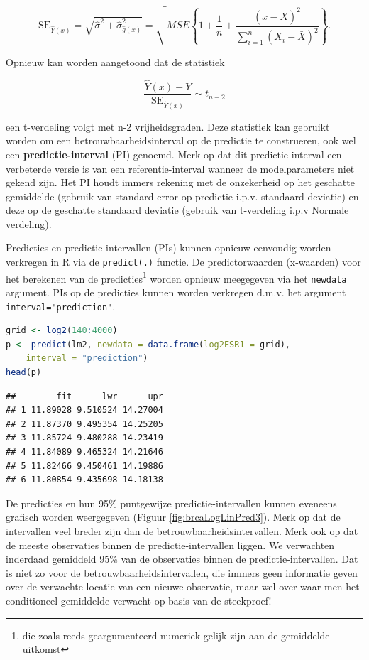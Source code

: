 \documentclass[
  12pt,dutch,coursenotes]{book}
\newcommand{\passthrough}[1]{#1}
\theoremstyle{definition}
\theoremstyle{definition}
\theoremstyle{definition}
\theoremstyle{definition}
\theoremstyle{remark}
\begin{document}
\[\text{SE}_{\hat{Y}(x)}=\sqrt{\hat\sigma^2+\hat\sigma^2_{\hat{g}(x)}}=\sqrt{MSE\left\{1+\frac{1}{n}+\frac{(x-\bar X)^2}{\sum\limits_{i=1}^n (X_i-\bar X)^2}\right\}}.\]

Opnieuw kan worden aangetoond dat de statistiek

\[\frac{\hat{Y}(x)-Y}{\text{SE}_{\hat{Y}(x)}}\sim t_{n-2}\]

een t-verdeling volgt met n-2 vrijheidsgraden.
Deze statistiek kan gebruikt worden om een betrouwbaarheidsinterval op de predictie te construeren, ook wel een \textbf{predictie-interval} (PI) genoemd.
Merk op dat dit predictie-interval een verbeterde versie is van een referentie-interval wanneer de modelparameters niet gekend zijn. Het PI houdt immers rekening met de onzekerheid op het geschatte gemiddelde (gebruik van standard error op predictie i.p.v. standaard deviatie) en deze op de geschatte standaard deviatie (gebruik van t-verdeling i.p.v Normale verdeling).

Predicties en predictie-intervallen (PIs) kunnen opnieuw eenvoudig worden verkregen in R via de \passthrough{\lstinline!predict(.)!} functie.
De predictorwaarden (x-waarden) voor het berekenen van de predicties\footnote{die zoals reeds geargumenteerd numeriek gelijk zijn aan de gemiddelde uitkomst} worden opnieuw meegegeven via het \passthrough{\lstinline!newdata!} argument.
PIs op de predicties kunnen worden verkregen d.m.v. het argument \passthrough{\lstinline!interval="prediction"!}.

\begin{lstlisting}[language=R]
grid <- log2(140:4000)
p <- predict(lm2, newdata = data.frame(log2ESR1 = grid),
    interval = "prediction")
head(p)
\end{lstlisting}

\begin{lstlisting}
##        fit      lwr      upr
## 1 11.89028 9.510524 14.27004
## 2 11.87370 9.495354 14.25205
## 3 11.85724 9.480288 14.23419
## 4 11.84089 9.465324 14.21646
## 5 11.82466 9.450461 14.19886
## 6 11.80854 9.435698 14.18138
\end{lstlisting}

De predicties en hun 95\% puntgewijze predictie-intervallen kunnen eveneens grafisch worden weergegeven (Figuur \ref{fig:brcaLogLinPred3}).
Merk op dat de intervallen veel breder zijn dan de betrouwbaarheidsintervallen.
Merk ook op dat de meeste observaties binnen de predictie-intervallen liggen.
We verwachten inderdaad gemiddeld 95\% van de observaties binnen de predictie-intervallen.
Dat is niet zo voor de betrouwbaarheidsintervallen, die immers geen informatie geven over de verwachte locatie van een nieuwe observatie, maar wel over waar men het conditioneel gemiddelde verwacht op basis van de steekproef!
\end{document}
